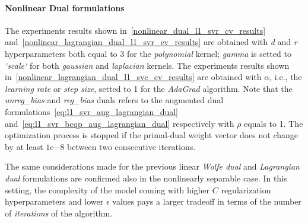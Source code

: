 \paragraph{Nonlinear Dual formulations}

The experiments results shown in~\ref{nonlinear_dual_l1_svr_cv_results} and~\ref{nonlinear_lagrangian_dual_l1_svr_cv_results} are obtained with \emph{d} and \emph{r} hyperparameters both equal to 3 for the \emph{polynomial} kernel; \emph{gamma} is setted to \emph{`scale`} for both \emph{gaussian} and \emph{laplacian} kernels. The experiments results shown in~\ref{nonlinear_lagrangian_dual_l1_svc_cv_results} are obtained with $\alpha$, i.e., the \emph{learning rate} or \emph{step size}, setted to 1 for the \emph{AdaGrad} algorithm. Note that the \emph{unreg\_bias} and \emph{reg\_bias} duals refers to the augmented dual formulations~\eqref{eq:l1_svr_aug_lagrangian_dual} and~\eqref{eq:l1_svr_bcqp_aug_lagrangian_dual} respectively with $\rho$ equals to 1. The optimization process is stopped if the primal-dual weight vector does not change by at least $1\mathrm{e}{-8}$  between two consecutive iterations.





The same considerations made for the previous linear \emph{Wolfe dual} and \emph{Lagrangian dual} formulations are confirmed also in the nonlinearly separable case. In this setting, the complexity of the model coming with higher $C$ regularization hyperparameters and lower $\epsilon$ values pays a larger tradeoff in terms of the number of \emph{iterations} of the algorithm.

